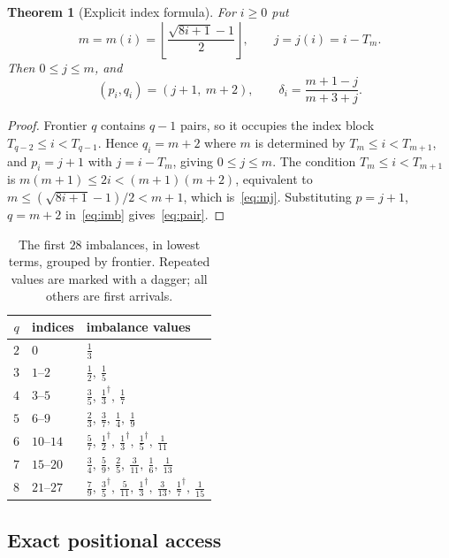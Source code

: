 \documentclass[11pt,a4paper]{article}
\theoremstyle{plain}
\newtheorem{theorem}{Theorem}[section]
\theoremstyle{definition}
\theoremstyle{remark}
\begin{document}
\begin{theorem}[Explicit index formula]\label{thm:index}
For $i \ge 0$ put
\begin{equation}\label{eq:mj}
  m = m(i) = \left\lfloor \frac{\sqrt{8i+1}-1}{2} \right\rfloor,
  \qquad j = j(i) = i - T_m .
\end{equation}
Then $0 \le j \le m$, and
\begin{equation}\label{eq:pair}
  (p_i, q_i) = (j+1,\ m+2), \qquad
  \delta_i = \frac{m+1-j}{m+3+j}.
\end{equation}
\end{theorem}

\begin{proof}
Frontier $q$ contains $q-1$ pairs, so it occupies the index block
$T_{q-2} \le i < T_{q-1}$. Hence $q_i = m+2$ where $m$ is determined by
$T_m \le i < T_{m+1}$, and $p_i = j+1$ with $j = i - T_m$, giving
$0 \le j \le m$. The condition $T_m \le i < T_{m+1}$ is
$m(m+1) \le 2i < (m+1)(m+2)$, equivalent to
$m \le (\sqrt{8i+1}-1)/2 < m+1$, which is~\eqref{eq:mj}. Substituting
$p = j+1$, $q = m+2$ in~\eqref{eq:imb} gives~\eqref{eq:pair}.
\end{proof}

\begin{table}[t]
\centering
\caption{The first $28$ imbalances, in lowest terms, grouped by frontier.
Repeated values are marked with a dagger; all others are first arrivals.}
\label{tab:first}
\begin{tabular}{cll}
\toprule
$q$ & indices & imbalance values \\
\midrule
$2$ & $0$ & $\tfrac13$ \\
$3$ & $1$--$2$ & $\tfrac12,\ \tfrac15$ \\
$4$ & $3$--$5$ & $\tfrac35,\ \tfrac13^\dagger,\ \tfrac17$ \\
$5$ & $6$--$9$ & $\tfrac23,\ \tfrac37,\ \tfrac14,\ \tfrac19$ \\
$6$ & $10$--$14$ & $\tfrac57,\ \tfrac12^\dagger,\ \tfrac13^\dagger,\ \tfrac15^\dagger,\ \tfrac1{11}$ \\
$7$ & $15$--$20$ & $\tfrac34,\ \tfrac59,\ \tfrac25,\ \tfrac3{11},\ \tfrac16,\ \tfrac1{13}$ \\
$8$ & $21$--$27$ & $\tfrac79,\ \tfrac35^\dagger,\ \tfrac5{11},\ \tfrac13^\dagger,\ \tfrac3{13},\ \tfrac17^\dagger,\ \tfrac1{15}$ \\
\bottomrule
\end{tabular}
\end{table}

\subsection{Exact positional access}
\end{document}
